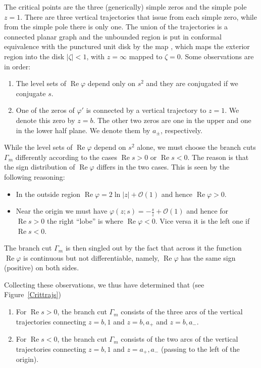 \documentclass[10pt,a4paper]{amsart}
\numberwithin{equation}{section}
\theoremstyle{definition}
\def \Re{\operatorname{Re} }
\begin{document}
The critical points are the three (generically) simple zeros and the simple pole $z=1$. There are three vertical trajectories that issue from each simple zero, while from the simple pole there is only one.
The union of the trajectories is a connected planar graph and the unbounded region is put in conformal equivalence with the punctured unit disk by the map
,
which maps the exterior region into the disk $|\zeta|<1$, with $z=\infty$ mapped to $\zeta=0$.
 Some observations are in order:
 \begin{enumerate}\itemsep=0pt
 \item[(1)]
 The level sets of $\Re \varphi$ depend only on $s^2$ and they are conjugated if we conjugate $s$.
 \item[(2)] One of the zeros of $\varphi'$ is connected by a vertical trajectory to $z=1$. We denote this zero by $z=b$. The other two zeros are one in the upper and one in the lower half plane. We denote them by $a_\pm$, respectively.
 \end{enumerate}
While the level sets of $\Re \varphi$ depend on $s^2$ alone, we must choose the branch cuts $\Gamma_m$ differently according to the cases $\Re s>0$ or $\Re s<0$. The reason is that the sign distribution of $\Re \varphi$ differs in the two cases.
This is seen by the following reasoning:
\begin{itemize}\itemsep=0pt
\item In the outside region $\Re \varphi = 2 \ln|z| + \mathcal O(1)$ and hence $\Re \varphi>0$.
\item Near the origin we must have $\varphi(z;s) = -\frac s z + \mathcal O(1)$ and hence for $\Re s>0$ the right ``lobe'' is where $\Re \varphi<0$. Vice versa it is the left one if $\Re s<0$.
\end{itemize}
 The branch cut $\Gamma_m$ is then singled out by the fact that across it the function $\Re \varphi$ is continuous but not differentiable, namely, $\Re \varphi$ has the same sign (positive) on both sides.

 Collecting these observations, we thus have determined that  (see Figure~\ref{Crittrajs})
 \begin{enumerate}\itemsep=0pt
 \item[(1)] For $\Re s>0$, the branch cut $\Gamma_m$ consists of the three arcs of the vertical trajectories connecting $z=b,1$ and $z=b,a_+$ and $z=b,a_-$.
 \item[(2)] For $\Re s<0$, the branch cut $\Gamma_m$ consists of the two arcs of the vertical trajectories connecting $z=b,1$ and $z=a_+,a_-$ (passing to the left of the origin).
 \end{enumerate}
\end{document}
